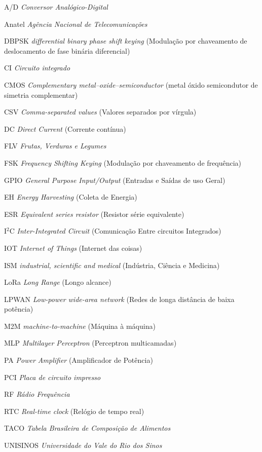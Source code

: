 \begin{siglas}
    \item[A/D] \textit{Conversor Analógico-Digital}
    \item[Anatel]   \textit{Agência Nacional de Telecomunicações}
    \item[DBPSK]    \textit{differential binary phase shift keying} (Modulação por chaveamento de deslocamento de fase binária diferencial)
    \item[CI]   \textit{Circuito integrado}
    \item[CMOS] \textit{Complementary metal–oxide–semiconductor}  (metal óxido semicondutor de simetria complementar)
    \item[CSV]  \textit{Comma-separated values} (Valores separados por vírgula)
    \item[DC]  \textit{Direct Current} (Corrente contínua)
    \item[FLV] \textit{Frutas, Verduras e Legumes}
    \item[FSK] \textit{Frequency Shifting Keying} (Modulação por chaveamento de frequência)
    \item[GPIO]     \textit{General Purpose Input/Output} (Entradas e Saídas de uso Geral)
    \item[EH]   \textit{Energy Harvesting} (Coleta de Energia) 
    \item[ESR]  \textit{Equivalent series resistor} (Resistor série equivalente)
    \item[I$^2$C]  \textit{Inter-Integrated Circuit} (Comunicação Entre circuitos Integrados)
    \item[IOT]  \textit{Internet of Things} (Internet das coisas)
    \item[ISM]  \textit{industrial, scientific and medical} (Indústria, Ciência e Medicina)
    \item[LoRa] \textit{Long Range} (Longo alcance)
    \item[LPWAN] \textit{Low-power wide-area network} (Redes de longa distância de baixa potência)
    \item[M2M] \textit{machine-to-machine} (Máquina à máquina) 
    \item[MLP] \textit{Multilayer Perceptron} (Perceptron multicamadas)
    \item[PA]  \textit{Power Amplifier} (Amplificador de Potência)
    \item[PCI] \textit{Placa de circuito impresso}
    \item[RF]  \textit{Rádio Frequência}
    \item[RTC]  \textit{Real-time clock} (Relógio de tempo real)
    \item[TACO] \textit{Tabela Brasileira de Composição de Alimentos}
    \item[UNISINOS]  \textit{Universidade do Vale do Rio dos Sinos}

\end{siglas}

